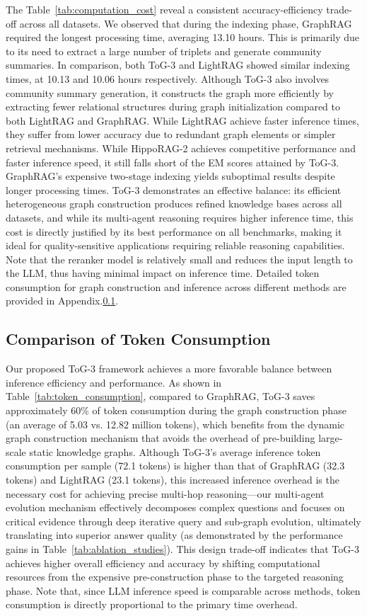 The Table~\ref{tab:computation_cost} reveal a consistent accuracy-efficiency trade-off across all datasets. 
We observed that during the indexing phase, GraphRAG required the longest processing time, averaging 13.10 hours. This is primarily due to its need to extract a large number of triplets and generate community summaries. In comparison, both ToG-3 and LightRAG showed similar indexing times, at 10.13 and 10.06 hours respectively. Although ToG-3 also involves community summary generation, it constructs the graph more efficiently by extracting fewer relational structures during graph initialization compared to both LightRAG and GraphRAG.
While LightRAG achieve faster inference times, they suffer from lower accuracy due to redundant graph elements or simpler retrieval mechanisms. 
While HippoRAG-2 achieves competitive performance and faster inference speed, it still falls short of the EM scores attained by ToG-3.
GraphRAG's expensive two-stage indexing yields suboptimal results despite longer processing times. 
ToG-3 demonstrates an effective balance: its efficient heterogeneous graph construction produces refined knowledge bases across all datasets, and while its multi-agent reasoning requires higher inference time, this cost is directly justified by its best performance on all benchmarks, making it ideal for quality-sensitive applications requiring reliable reasoning capabilities.
Note that the reranker model is relatively small and reduces the input length to the LLM, thus having minimal impact on inference time.
Detailed token consumption for graph construction and inference across different methods are provided in Appendix.\ref{appendix:token_consumption}.

\subsection{Comparison of Token Consumption}
\label{appendix:token_consumption}
Our proposed ToG-3 framework achieves a more favorable balance between inference efficiency and performance. As shown in Table~\ref{tab:token_consumption}, compared to GraphRAG, ToG-3 saves approximately 60\% of token consumption during the graph construction phase (an average of 5.03 vs. 12.82 million tokens), which benefits from the dynamic graph construction mechanism that avoids the overhead of pre-building large-scale static knowledge graphs. Although ToG-3's average inference token consumption per sample (72.1 tokens) is higher than that of GraphRAG (32.3 tokens) and LightRAG (23.1 tokens), this increased inference overhead is the necessary cost for achieving precise multi-hop reasoning—our multi-agent evolution mechanism effectively decomposes complex questions and focuses on critical evidence through deep iterative query and sub-graph evolution, ultimately translating into superior answer quality (as demonstrated by the performance gains in Table~\ref{tab:ablation_studies}). This design trade-off indicates that ToG-3 achieves higher overall efficiency and accuracy by shifting computational resources from the expensive pre-construction phase to the targeted reasoning phase. Note that, since LLM inference speed is comparable across methods, token consumption is directly proportional to the primary time overhead.

